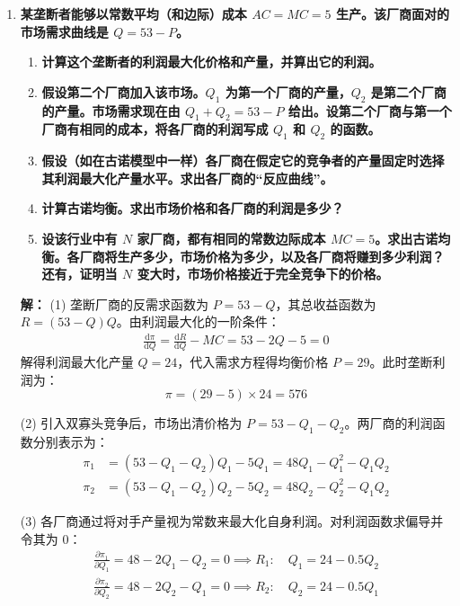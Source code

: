 \begin{enumerate}[label=\textbf{\arabic*.}, leftmargin=*]
		因为兼并意味着厂商 1 必须统筹承担全行业的成本与收益，故其兼并后的最大净利润为 50 美元。已知兼并前厂商 1 的古诺个体利润为 19.2 美元，因此厂商 1 愿意支付的最高收购价格为：
		\[ W = \pi_T - \pi_1 = 50 - 19.2 = 30.8 \text{（美元）} \]
		\newpage
		
		\item \textbf{某垄断者能够以常数平均（和边际）成本 $AC = MC = 5$ 生产。该厂商面对的市场需求曲线是 $Q = 53 - P$。}
		
		\begin{enumerate}
			\item \textbf{计算这个垄断者的利润最大化价格和产量，并算出它的利润。}
			\item \textbf{假设第二个厂商加入该市场。$Q_1$ 为第一个厂商的产量，$Q_2$ 是第二个厂商的产量。市场需求现在由 $Q_1 + Q_2 = 53 - P$ 给出。设第二个厂商与第一个厂商有相同的成本，将各厂商的利润写成 $Q_1$ 和 $Q_2$ 的函数。}
			\item \textbf{假设（如在古诺模型中一样）各厂商在假定它的竞争者的产量固定时选择其利润最大化产量水平。求出各厂商的“反应曲线”。}
			\item \textbf{计算古诺均衡。求出市场价格和各厂商的利润是多少？}
			\item \textbf{设该行业中有 $N$ 家厂商，都有相同的常数边际成本 $MC = 5$。求出古诺均衡。各厂商将生产多少，市场价格为多少，以及各厂商将赚到多少利润？还有，证明当 $N$ 变大时，市场价格接近于完全竞争下的价格。}
		\end{enumerate}
		
		\textbf{解：}
		(1) 垄断厂商的反需求函数为 $P = 53 - Q$，其总收益函数为 $R = (53 - Q)Q$。由利润最大化的一阶条件：
		\[
		\begin{aligned}
			\frac{\mathrm{d}\pi}{\mathrm{d}Q} = \frac{\mathrm{d}R}{\mathrm{d}Q} - MC = 53 - 2Q - 5 = 0
		\end{aligned}
		\]
		解得利润最大化产量 $Q = 24$，代入需求方程得均衡价格 $P = 29$。此时垄断利润为：
		\[ \pi = (29 - 5) \times 24 = 576 \]
		
		(2) 引入双寡头竞争后，市场出清价格为 $P = 53 - Q_1 - Q_2$。两厂商的利润函数分别表示为：
		\[
		\begin{aligned}
			\pi_1 &= (53 - Q_1 - Q_2)Q_1 - 5Q_1 = 48Q_1 - Q_1^2 - Q_1Q_2 \\
			\pi_2 &= (53 - Q_1 - Q_2)Q_2 - 5Q_2 = 48Q_2 - Q_2^2 - Q_1Q_2
		\end{aligned}
		\]
		
		(3) 各厂商通过将对手产量视为常数来最大化自身利润。对利润函数求偏导并令其为 0：
		\[
		\begin{aligned}
			\frac{\partial\pi_1}{\partial Q_1} = 48 - 2Q_1 - Q_2 = 0 \implies R_1: \quad Q_1 = 24 - 0.5Q_2 \\
			\frac{\partial\pi_2}{\partial Q_2} = 48 - 2Q_2 - Q_1 = 0 \implies R_2: \quad Q_2 = 24 - 0.5Q_1
		\end{aligned}
		\]
		

\end{enumerate}
